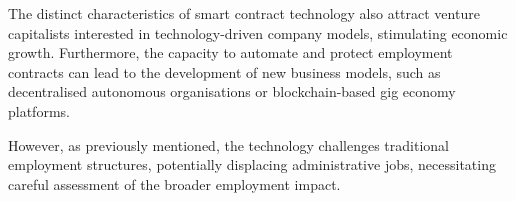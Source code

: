 The distinct characteristics of smart contract technology also attract venture capitalists interested in technology-driven company models, stimulating economic growth. Furthermore, the capacity to automate and protect employment contracts can lead to the development of new business models, such as decentralised autonomous organisations or blockchain-based gig economy platforms.

However, as previously mentioned, the technology challenges traditional employment structures, potentially displacing administrative jobs, necessitating careful assessment of the broader employment impact.